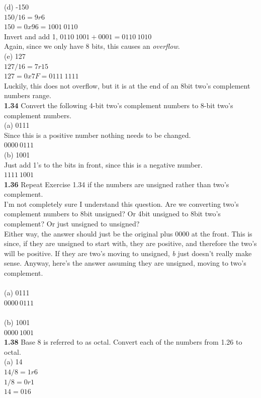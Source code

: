 \documentclass[12pt,a4paper]{report}
\begin{document}
\begin{normalsize}
(d) -150 \\
$ 150/16 = 9r6 $ \\
$ 150 = 0x96 = 1001\: 0110 $ \\
Invert and add 1, $ 0110\: 1001 + 0001 = 0110\: 1010 $ \\
Again, since we only have 8 bits, this causes an \emph{overflow}. \\

(e) 127 \\
$ 127/16 = 7r15 $ \\
$ 127 = 0x7F = 0111\: 1111 $ \\
Luckily, this does not overflow, but it is at the end of an 8bit two's complement numbers range. \\

\textbf{1.34} Convert the following 4-bit two's complement numbers to 8-bit two's complement numbers. \\
(a) 0111 \\
Since this is a positive number nothing needs to be changed. \\ 
$ 0000\: 0111 $ \\

(b) 1001 \\ 
Just add 1's to the bits in front, since this is a negative number. \\
$ 1111\: 1001 $ \\

\textbf{1.36} Repeat Exercise 1.34 if the numbers are unsigned rather than two's complement. \\
I'm not completely sure I understand this question. Are we converting two's complement numbers to 8bit unsigned? Or 4bit unsigned to 8bit two's complement? Or just unsigned to unsigned? \\
Either way, the answer should just be the original plus 0000 at the front. This is since, if they are unsigned to start with, they are positive, and therefore the two's will be positive. If they are two's moving to unsigned, \emph{b} just doesn't really make sense. Anyway, here's the answer assuming they are unsigned, moving to two's complement. \\ \\
(a) 0111 \\
$ 0000\: 0111 $ \\ \\
(b) 1001 \\
$ 0000\: 1001 $ \\

\textbf{1.38} Base 8 is referred to as octal. Convert each of the numbers from 1.26 to octal. \\
(a) 14 \\
$ 14/8 = 1r6 $ \\
$ 1/8 = 0r1 $ \\
$ 14 = 016 $ \\


\end{normalsize}
\end{document}
